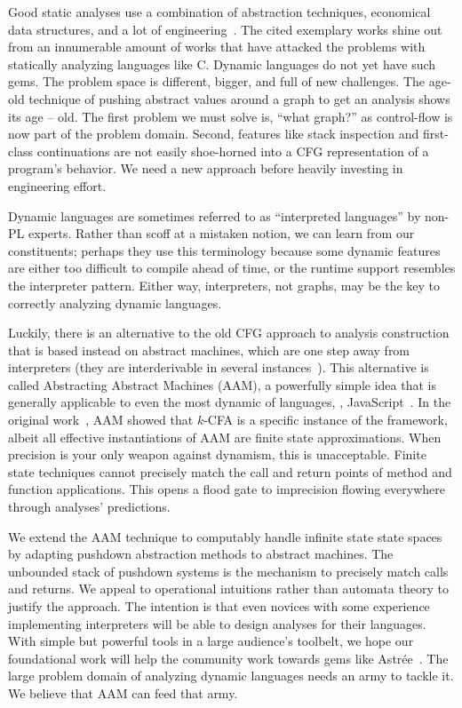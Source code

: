 Good static analyses use a combination of abstraction techniques, economical data structures, and a lot of engineering~\citep{ianjohnson:CousotEtAl-TASE07,ianjohnson:DBLP:journals/ipl/YiCKK07}.
%
The cited exemplary works shine out from an innumerable amount of works that have attacked the problems with statically analyzing languages like C.
%
Dynamic languages do not yet have such gems.
%
The problem space is different, bigger, and full of new challenges.
%
The age-old technique of pushing abstract values around a graph to get an analysis shows its age -- old.
%
The first problem we must solve is, ``what graph?'' as control-flow is now part of the problem domain.
%
Second, features like stack inspection and first-class continuations are not easily shoe-horned into a CFG representation of a program's behavior.
%
We need a new approach before heavily investing in engineering effort.

%
Dynamic languages are sometimes referred to as ``interpreted languages'' by non-PL experts.
%
Rather than scoff at a mistaken notion, we can learn from our constituents; perhaps they use this terminology because some dynamic features are either too difficult to compile ahead of time, or the runtime support resembles the interpreter pattern.
%
Either way, interpreters, not graphs, may be the key to correctly analyzing dynamic languages.
%

%
Luckily, there is an alternative to the old CFG approach to analysis construction that is based instead on abstract machines, which are one step away from interpreters (they are interderivable in several instances~\citep{ianjohnson:DBLP:conf/icfp/Danvy08}).
%
This alternative is called Abstracting Abstract Machines (AAM), a powerfully simple idea that is generally applicable to even the most dynamic of languages, \eg{}, JavaScript~\citep{ianjohnson:DBLP:journals/corr/KashyapDKWGSWH14}.
%
In the original work~\citep{dvanhorn:VanHorn2010Abstracting}, AAM showed that $k$-CFA is a specific instance of the framework, albeit all effective instantiations of AAM are finite state approximations.
%
When precision is your only weapon against dynamism, this is unacceptable.
%
Finite state techniques cannot precisely match the call and return points of method and function applications.
%
This opens a flood gate to imprecision flowing everywhere through analyses' predictions.
%

%
We extend the AAM technique to computably handle infinite state state spaces by adapting pushdown abstraction methods to abstract machines.
%
The unbounded stack of pushdown systems is the mechanism to precisely match calls and returns.
%
We appeal to operational intuitions rather than automata theory to justify the approach.
%
The intention is that even novices with some experience implementing interpreters will be able to design analyses for their languages.
%
With simple but powerful tools in a large audience's toolbelt, we hope our foundational work will help the community work towards gems like Astr\'ee~\citep{ianjohnson:CousotEtAl-TASE07}.
%
The large problem domain of analyzing dynamic languages needs an army to tackle it.
%
We believe that AAM can feed that army.